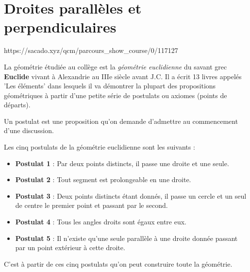 \chapter{Droites parallèles et perpendiculaires}
{https://sacado.xyz/qcm/parcours_show_course/0/117127}{\begin{His}
La géométrie étudiée au collège est la \textit{géométrie euclidienne} du savant grec \textbf{Euclide} vivant à Alexandrie au IIIe siècle avant J.C. Il a écrit 13 livres appelés 'Les éléments' dans lesquels il va démontrer la plupart des propositions géométriques à partir d'une petite série de postulats ou axiomes (points de départs).\\

\begin{Def}
Un postulat est une proposition qu'on demande d'admettre au commencement d'une discussion.
\end{Def}

Les cinq postulats de la géométrie euclidienne sont les suivants :
\begin{itemize}
\item \textbf{Postulat 1} : Par deux points distincts, il passe une droite et une seule.
\item \textbf{Postulat 2} : Tout segment est prolongeable en une droite.
\item \textbf{Postulat 3} : Deux points distincts étant donnés, il passe un cercle et un seul de centre le premier point et passant par le second.
\item \textbf{Postulat 4} : Tous les angles droits sont égaux entre eux.
\item \textbf{Postulat 5} : Il n'existe qu'une seule parallèle à une droite donnée passant par un point extérieur à cette droite.
\end{itemize}
C'est à partir de ces cinq postulats qu'on peut construire toute la géométrie.
\end{His}}

